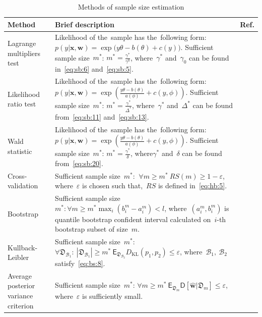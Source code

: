 \documentclass[
11pt,%
tightenlines,%
twoside,%
onecolumn,%
nofloats,%
nobibnotes,%
nofootinbib,%
superscriptaddress,%
noshowpacs,%
centertags]%
{revtex4}
\begin{document}
\begin{table}
\begin{center}
\caption{Methods of sample size estimation}
\label{table1}
\begin{tabular}{p{}|p{}|p{}}
\hline
	\centering Method &\centering Brief description & Ref.\\%
\hline
	Lagrange multipliers test &
	Likelihood of the~sample has the~following form: $p(y|\mathbf{x}, \mathbf{w}) = \exp\bigl(y\theta- b(\theta) + c(y)\bigr).$
	Sufficient sample size~$m^*$: $m^* = \frac{\gamma^*}{\gamma^0}$, where~$\gamma^*$ and~$\gamma_0$ can be found in~\eqref{eq:sb:6} and~\eqref{eq:sb:5}.
	&\cite{self1988}\\
\hline
	Likelihood ratio test &
	Likelihood of the~sample has the~following form: $p(y|\mathbf{x}, \mathbf{w}) = \exp\left(\frac{y\theta- b(\theta)}{a(\phi)} + c\left(y, \phi\right)\right).$ Sufficient sample size~$m^*$:  $m^* = \frac{\gamma^*}{\Delta^*}$, where~$\gamma^*$ and~$\Delta^*$ can be found from~\eqref{eq:sb:11} and~\eqref{eq:sb:13}.
	&\cite{shieh2000}\\
\hline
	Wald statistic &
	Likelihood of the~sample has the~following form: $p(y|\mathbf{x}, \mathbf{w}) = \exp\left(\frac{y\theta- b(\theta)}{a(\phi)} + c\left(y, \phi\right)\right).$ Sufficient sample size~$m^*$: $m^* = \frac{\gamma^*}{\delta}$, where$\gamma^*$ and~$\delta$ can be found from~\eqref{eq:sb:20}.
	&\cite{shieh2005}\\
\hline
	Cross-validation &
	Sufficient sample size~$m^*$: $~\forall m \geq m^*~RS(m) \geq 1- \varepsilon$, where~$\varepsilon$ is chosen such that,~$RS$ is defined in~\eqref{eq:hb:5}.
	&\cite{motrenko2014}\\
\hline
	Bootstrap &
	Sufficient sample size~$m^*: \forall m\geq m^* \max_i\left(b^m_i - a^m_i\right) < l$, where~$(a^m_i, b^m_i)$ is quantile bootstrap confident interval calculated on~$i$-th bootstrap subset of size~$m$.
	&\cite{qumsiyeh2013}\\
\hline
	Kullback-Leibler &	
	Sufficient sample size~$m^*$: $\forall \mathfrak{D}_{\mathcal{B}_1}:~\left|\mathfrak{D}_{\mathcal{B}_1}\right| \geq m^* ~ \mathsf{E}_{\mathfrak{D}_{\mathcal{B}_2}}D_\text{KL}\left(p_1, p_2\right) \leq \varepsilon$,
	where~$\mathcal{B}_1,~\mathcal{B}_2$ satisfy~\eqref{eq:bs:8}.
	&\cite{motrenko2014}\\
\hline
	Average posterior variance criterion &
	Sufficient sample size~$m^*$:  $\forall m \geq m^* ~ \mathsf{E}_{\mathfrak{D}_m}\mathsf{D}\left[\hat{\mathbf{w}}|\mathfrak{D}_m\right] \leq \varepsilon$, where~$\varepsilon$ is sufficiently small.

\end{tabular}
\end{center}
\end{table}
\end{document}
